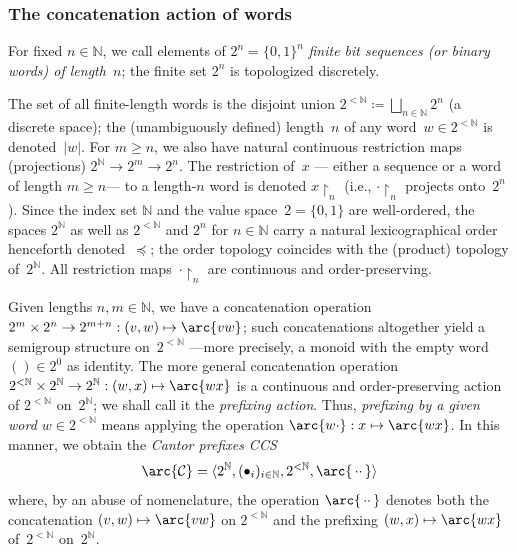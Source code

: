 \subsubsection{The concatenation action of words}\label{sec:concat}
For fixed $n\in \mathbb{N}$, we call elements of $2^n = \{0,1\}^n$ \emph{finite bit sequences \emph{(or \emph{binary words})} of length~$n$}; the finite set $2^n$ is topologized discretely.

The set of all finite-length words is the disjoint union $2^{<\mathbb{N}}\coloneqq \bigsqcup_{n\in \mathbb{N}}2^n$ (a discrete space); the (unambiguously defined) length~$n$ of any word~$w\in 2^{<\mathbb{N}}$ is denoted~$|w|$.
For $m\ge n$, we also have natural continuous restriction maps (projections)
$2^{\mathbb{N}}\rightarrow 2^m\rightarrow 2^n$.
The restriction of~$x$ — either a sequence or a word of length $m\ge n$— to a length-$n$ word is denoted $x\restriction_n$ (i.e., $\cdot\restriction_n$ projects onto~$2^n$).
Since the index set $\mathbb{N}$ and the value space~$2 = \{0, 1\}$ are well-ordered, the spaces $2^{\mathbb{N}}$ as well as $2^{<\mathbb{N}}$ and $2^n$ for $n\in \mathbb{N}$ carry a natural lexicographical order henceforth denoted~$\preceq$;
the order topology coincides with the (product) topology of~$2^{\mathbb{N}}$.
All restriction maps~$\cdot\restriction_n$ are continuous and order-preserving.

Given lengths $n, m\in \mathbb{N}$, we have a concatenation operation $2^m\times 2^n\to 2^{m+n}: (v,w)\mapsto \arc{vw}$; such concatenations altogether yield a semigroup structure on~$2^{<\mathbb{N}}$ —more precisely, a monoid with the empty word $()\in 2^0$ as identity.
The more general concatenation operation $2^{<\mathbb{N}}\times 2^{\mathbb{N}}\to 2^{\mathbb{N}}: (w,x)\mapsto \arc{wx}$ is a continuous and order-preserving action of $2^{<\mathbb{N}}$ on~$2^{\mathbb{N}}$;
we shall call it the \emph{prefixing action}.
Thus, \emph{prefixing by a given word $w\in 2^{<\mathbb{N}}$} means applying the operation $\arc{w\cdot}: x\mapsto \arc{wx}$.
In this manner, we obtain the \emph{Cantor prefixes CCS}
\begin{equation*}
    \arc{\mathcal{C}} = \langle2^{\mathbb{N}}, (\bullet_i)_{i\in \mathbb{N}}, 2^{<\mathbb{N}}, \arc{\,\cdot\cdot\,}\rangle
\end{equation*}
where, by an abuse of nomenclature, the operation $\arc{\,\cdot\cdot\,}$ denotes both the concatenation $(v,w)\mapsto\arc{vw}$ on $2^{<\mathbb{N}}$ and the prefixing $(w,x)\mapsto\arc{wx}$ of~$2^{<\mathbb{N}}$ on~$2^{\mathbb{N}}$.


